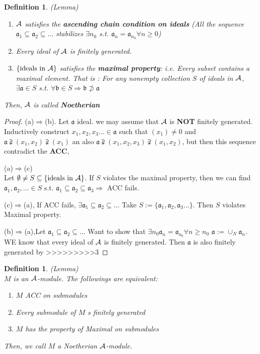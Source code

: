 \documentclass[11pt]{article}
\newtheorem{dfn}[thm]{Definition}
\newcommand{\sca}{{\mathfrak a}}
\newcommand{\scb}{{\mathfrak b}}
\newcommand{\cala}{{\cal A}}
\newcommand{\Lrta}{\Longrightarrow}
\begin{document}
\begin{dfn}
(Lemma) 
\begin{enumerate}[label=(\alph*)]
\item $\cala$ satisfies the \textbf{ascending chain condition on ideals} (All the sequence $\sca_1\subseteq \sca_2\subseteq ...$ stabilizes $\exists n_0$ s.t. $\sca_n=\sca_{n_0} \forall n\geq 0$)
\item Every ideal of $\cala$ is finitely generated.
\item $\{\text{ideals in $\cala$}\}$ satisfies the \textbf{maximal property}: i.e. Every subset contains a maximal element. That is : For any nonempty collection $S$ of ideals in $\cala$, $\exists \sca\in S$ s.t. $\forall \scb\in S\Lrta \scb\not \supset \sca$
\end{enumerate}
Then, $\cala$ is called \textbf{Noetherian}
\end{dfn}
\begin{proof}
(a)$\Lrta$(b). Let $\sca$ ideal. we may assume that $\cala$ is \textbf{NOT} finitely generated. Inductively construct $x_1, x_2,x_3...\in \sca$ such that $(x_1)\neq 0$ and $\sca\supsetneqq(x_1,x_2)\supsetneqq(x_1)$ an also $\sca\supsetneqq(x_1,x_2,x_3)\supsetneqq(x_1,x_2)$, but then this sequence contradict the \textbf{ACC},

(a)$\Lrta$(c)\\
Let $\emptyset \neq S\subseteq \{\text{ideals in }\cala\}$. If $S$ violates the maximal property, then we can find $\sca_1,\sca_2,...\in S$ s.t. $\sca_1\subseteq \sca_2\subseteq \sca_3\Lrta $ ACC fails.

(c)$\Lrta $(a), If ACC fails, $\exists \sca_1\subseteq \sca_2\subseteq ...$ Take $S:=\{\sca_1,\sca_2,\sca_3...\}$. Then $S$ violates Maximal property.

(b)$\Lrta$(a),Let $\sca_1\subseteq\sca_2\subseteq ...$ Want to show that $\exists n_0\sca_n=\sca_{a_0}\forall n\geq n_0$ $\sca:=\cup_N \sca_n$. WE know that every ideal of $\cala$ is finitely generated. Then $\sca$ is also finitely generated by 
>>>>>>>>>3
\end{proof}

\begin{dfn}(Lemma)\\
$M$ is an $\cala$-module. The followings are equivalent:
\begin{enumerate}[label=(\alph*)]
\item $M$ ACC on submodules
\item Every submodule of $M$ s finitely generated
\item $M$ has the property of Maximal on submodules
\end{enumerate}
Then, we call $M$ a Noetherian $\cala$-module.
\end{dfn}
\end{document}
